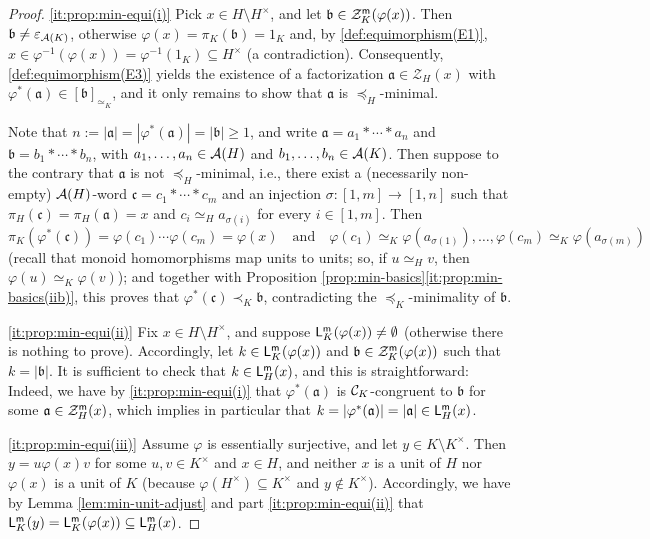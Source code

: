 \begin{proof}
	\ref{it:prop:min-equi(i)}
	Pick $x\in H \setminus H^\times$, and let $\mathfrak b \in \mathcal{Z}_K^{\mathsf{m}}(\varphi(x))$. Then $\mathfrak b \ne \varepsilon_{\mathcal{A}(K)}$, otherwise $\varphi(x) = \pi_K(\mathfrak b) = 1_K$ and, by \ref{def:equimorphism(E1)}, $x \in \varphi^{-1}(\varphi(x)) = \varphi^{-1}(1_K) \subseteq H^\times$ (a contradiction). Consequently, \ref{def:equimorphism(E3)} yields the existence of a factorization $\mathfrak{a}\in \mathcal{Z}_H(x)$ with $\varphi^*(\mathfrak{a}) \in [ \mathfrak{b} ]_{\simeq_K}$, and it only remains to show that $\mathfrak a$ is $\preceq_H$-minimal. 
	
	{Note that} $n := |\mathfrak a| = |\varphi^\ast(\mathfrak a)| = |\mathfrak b| \ge 1$, and write $\mathfrak a = a_1 \ast \cdots \ast a_n$ and $\mathfrak b = b_1 \ast \cdots \ast b_n$, with $a_1, \ldots, a_n \in \mathcal{A}(H)$ and $b_1, \ldots, b_n \in \mathcal{A}(K)$. Then suppose to the contrary that $\mathfrak a$ is not $\preceq_H$-minimal, i.e., there exist a (necessarily non-empty) $\mathcal{A}(H)$-word $\mathfrak{c} = c_1 \ast \cdots \ast c_m$ and an injection $\sigma: [ 1, m ] \to [ 1, n ]$ such that $\pi_H(\mathfrak c) = \pi_H(\mathfrak a) = x$ and $c_i \simeq_H a_{\sigma(i)}$ for every $i \in [ 1, m ]$. Then
	\[
	\pi_K(\varphi^\ast(\mathfrak c)) = \varphi(c_1) \cdots \varphi(c_m) = \varphi(x)
	\quad\text{and}\quad
	\varphi(c_1) \simeq_K \varphi(a_{\sigma(1)}), \ldots, \varphi(c_m) \simeq_K \varphi(a_{\sigma(m)})
	\]
	(recall that monoid hom\-o\-mor\-phisms map units to units; so, if $u \simeq_H v$, then $\varphi(u) \simeq_K \varphi(v)$); and together with Proposition \ref{prop:min-basics}\ref{it:prop:min-basics(iib)}, this proves that 
	$\varphi^\ast(\mathfrak c) \prec_K \mathfrak b$, contradicting the $\preceq_K$-minimality of $\mathfrak b$.
	
	\ref{it:prop:min-equi(ii)} Fix $x \in H \setminus H^\times$, and suppose $\mathsf{L}_K^{\mathsf{m}}(\varphi(x)) \ne \emptyset$ (otherwise there is nothing to prove). Accordingly, let $k \in \mathsf{L}_K^{\mathsf{m}}(\varphi(x))$ and $\mathfrak b \in \mathcal Z_K^{\mathsf{m}}(\varphi(x))$ such that $k = |\mathfrak b|$. It is sufficient to check that $k \in \mathsf L_H^{\mathsf{m}}(x)$, and this is straightforward: Indeed, we have by \ref{it:prop:min-equi(i)} that $\varphi^\ast(\mathfrak a)$ is $\mathcal{C}_K$-congruent to $\mathfrak b$ for some $\mathfrak a \in \mathcal Z_H^{\mathsf{m}}(x)$, which implies in particular that $k = |\varphi^\ast(\mathfrak a)| = |\mathfrak a| \in \mathsf L_H^{\mathsf{m}}(x)$.
	
	\ref{it:prop:min-equi(iii)} Assume $\varphi$ is essentially surjective, and let $y \in K \setminus K^\times$. Then $y = u \varphi(x) v$ for some $u,v\in K^\times$ and $x\in H$, and neither $x$ is a unit of $H$ nor $\varphi(x)$ is a unit of $K$ (because $\varphi(H^\times) \subseteq K^\times$ and $y \notin K^\times$). Accordingly, we have by Lemma \ref{lem:min-unit-adjust} and part \ref{it:prop:min-equi(ii)} that $\mathsf{L}_K^{\mathsf{m}}(y) = \mathsf{L}_K^{\mathsf{m}}(\varphi(x)) \subseteq \mathsf{L}_H^{\mathsf{m}}(x)$.
\end{proof}
%

